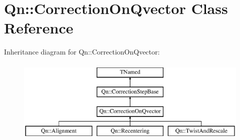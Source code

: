 \hypertarget{classQn_1_1CorrectionOnQvector}{}\section{Qn\+:\+:Correction\+On\+Qvector Class Reference}
\label{classQn_1_1CorrectionOnQvector}
Inheritance diagram for Qn\+:\+:Correction\+On\+Qvector\+:\begin{figure}[H]
\begin{center}
\leavevmode
\includegraphics[height=4.000000cm]{classQn_1_1CorrectionOnQvector}
\end{center}
\end{figure}
